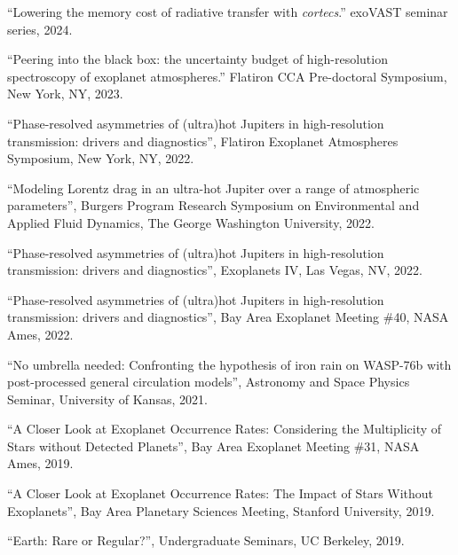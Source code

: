 \documentclass[letterpaper,12pt]{article}
\renewcommand{\scriptsize}{\normalsize}
\begin{document}
\begin{list}{}{\cvlist}
  \item[{\color{numcolor}\scriptsize10}] ``Lowering the memory cost of radiative transfer with \textit{cortecs}.'' exoVAST seminar series, 2024.
  

  \item[{\color{numcolor}\scriptsize9}] ``Peering into the black box: 
the uncertainty budget of high-resolution spectroscopy of exoplanet atmospheres.'' Flatiron CCA Pre-doctoral Symposium, New York, NY, 2023.

 \item[{\color{numcolor}\scriptsize8}]  ``Phase-resolved asymmetries of (ultra)hot Jupiters in high-resolution transmission: drivers and diagnostics'', Flatiron Exoplanet Atmospheres Symposium, New York, NY, 2022.

\item[{\color{numcolor}\scriptsize7}] ``Modeling Lorentz drag in an ultra-hot Jupiter over a range of atmospheric parameters'', Burgers Program Research Symposium on Environmental and Applied Fluid Dynamics, The George Washington University, 2022.

\item[{\color{numcolor}\scriptsize6}] ``Phase-resolved asymmetries of (ultra)hot Jupiters in high-resolution transmission: drivers and diagnostics'', Exoplanets IV, Las Vegas, NV, 2022.


\item[{\color{numcolor}\scriptsize5}] ``Phase-resolved asymmetries of (ultra)hot Jupiters in high-resolution transmission: drivers and diagnostics'', Bay Area Exoplanet Meeting \#40, NASA Ames, 2022.


\item[{\color{numcolor}\scriptsize4}]  ``No umbrella needed: Confronting the hypothesis of iron rain on WASP-76b with post-processed general circulation models'', Astronomy and Space Physics Seminar, University of Kansas, 2021.



\item[{\color{numcolor}\scriptsize3}] “A Closer Look at Exoplanet Occurrence Rates: Considering the Multiplicity of Stars without Detected Planets”, Bay Area Exoplanet Meeting \#31, NASA Ames, 2019.

\item[{\color{numcolor}\scriptsize2}]  “A Closer Look at Exoplanet Occurrence Rates: The Impact of Stars Without Exoplanets”, Bay Area Planetary Sciences Meeting, Stanford University, 2019.

\item[{\color{numcolor}\scriptsize1}] “Earth: Rare or Regular?”, Undergraduate Seminars, UC Berkeley, 2019.

\end{list}
\end{document}
